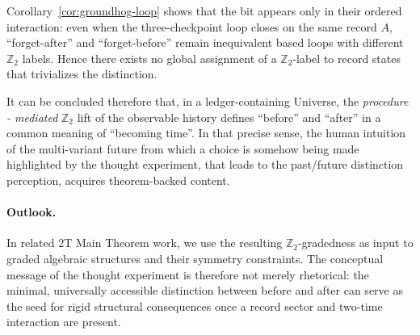 \documentclass[aps,prl,reprint,floatfix]{revtex4-2}
\theoremstyle{plain}
\theoremstyle{definition}
\begin{document}
Corollary~\ref{cor:groundhog-loop} shows that the bit appears only in their ordered interaction: even when the three-checkpoint loop closes on the same record $A$, ``forget-after'' and ``forget-before'' remain inequivalent based loops with different $\mathbb Z_2$ labels. Hence there exists no global assignment
of a $\mathbb Z_2$-label to record states that trivializes the distinction. 

It can be concluded therefore that, in a ledger-containing Universe, the \emph{procedure - mediated} \(\mathbb{Z}_2\) lift of the observable history defines ``before'' and ``after'' in a common meaning of ``becoming time''. In that precise sense, the human intuition of the multi-variant future
from which a choice is somehow being made highlighted by the thought experiment, that leads to the past/future distinction perception, acquires theorem-backed content.

\paragraph{Outlook.}In related 2T Main Theorem work, we use the resulting $\mathbb Z_2$-gradedness as input to graded algebraic structures and their
symmetry constraints. The conceptual message of the thought experiment is therefore not merely rhetorical: the minimal, universally accessible
distinction between before and after can serve as the seed for rigid structural consequences once a record sector and two-time interaction are present.
\end{document}
